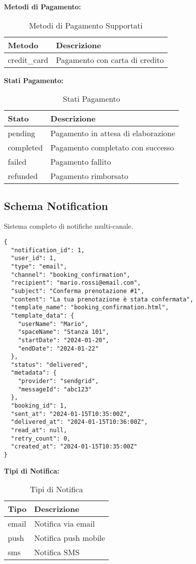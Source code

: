 \textbf{Metodi di Pagamento:}
\begin{table}[H]
\centering
\begin{tabular}{@{}ll@{}}
\toprule
\textbf{Metodo} & \textbf{Descrizione} \\
\midrule
credit\_card & Pagamento con carta di credito \\
\bottomrule
\end{tabular}
\caption{Metodi di Pagamento Supportati}
\end{table}

\textbf{Stati Pagamento:}
\begin{table}[H]
\centering
\begin{tabular}{@{}ll@{}}
\toprule
\textbf{Stato} & \textbf{Descrizione} \\
\midrule
pending & Pagamento in attesa di elaborazione \\
completed & Pagamento completato con successo \\
failed & Pagamento fallito \\
refunded & Pagamento rimborsato \\
\bottomrule
\end{tabular}
\caption{Stati Pagamento}
\end{table}

\subsection{Schema Notification}
Sistema completo di notifiche multi-canale.

\begin{lstlisting}[caption=Schema Notification]
{
  "notification_id": 1,
  "user_id": 1,
  "type": "email",
  "channel": "booking_confirmation",
  "recipient": "mario.rossi@email.com",
  "subject": "Conferma prenotazione #1",
  "content": "La tua prenotazione è stata confermata",
  "template_name": "booking_confirmation.html",
  "template_data": {
    "userName": "Mario",
    "spaceName": "Stanza 101",
    "startDate": "2024-01-20",
    "endDate": "2024-01-22"
  },
  "status": "delivered",
  "metadata": {
    "provider": "sendgrid",
    "messageId": "abc123"
  },
  "booking_id": 1,
  "sent_at": "2024-01-15T10:35:00Z",
  "delivered_at": "2024-01-15T10:36:00Z",
  "read_at": null,
  "retry_count": 0,
  "created_at": "2024-01-15T10:35:00Z"
}
\end{lstlisting}

\textbf{Tipi di Notifica:}
\begin{table}[H]
\centering
\begin{tabular}{@{}ll@{}}
\toprule
\textbf{Tipo} & \textbf{Descrizione} \\
\midrule
email & Notifica via email \\
push & Notifica push mobile \\
sms & Notifica SMS \\
\bottomrule
\end{tabular}
\caption{Tipi di Notifica}
\end{table}

